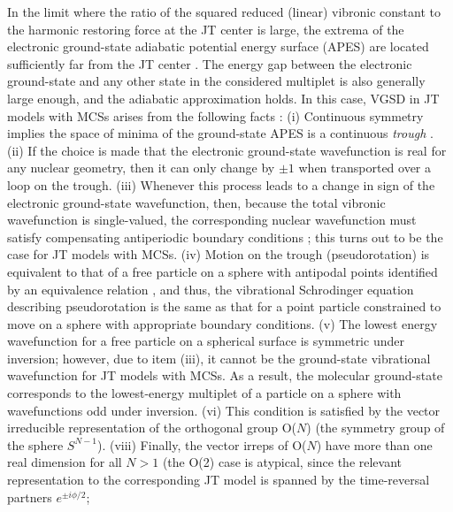 \documentclass[superscriptaddress,showpacs,amsmath,amssymb,pra,twocolumn]{revtex4-1}
\begin{document}
In the limit where the ratio of the squared reduced (linear) vibronic constant
to the harmonic restoring force at the JT center is large, the extrema
of the electronic ground-state adiabatic potential energy surface
(APES) are located sufficiently far from the JT center \cite{bersuker_jahn-teller_2006}.
The energy gap between the electronic ground-state and any other state
in the considered multiplet is also generally large enough, and the
adiabatic approximation holds. In this case, VGSD in JT models with
MCSs arises from the following facts \cite{bersuker_jahn-teller_2006,chancey1997jahn}:
(i) Continuous symmetry implies the space of minima of the ground-state
APES is a continuous \textit{trough} \cite{pooler_continuous_1978,judd_jahnteller_1984,ceulemans_a._structure_1987,ribeiro_continuous_2017}.
(ii) If the choice is made that the electronic ground-state wavefunction
is real for any nuclear geometry, then it can only change by $\pm1$
when transported over a loop on the trough. (iii) Whenever this process
leads to a change in sign of the electronic ground-state wavefunction,
then, because the total vibronic wavefunction is single-valued, the
corresponding nuclear wavefunction must satisfy compensating antiperiodic
boundary conditions \cite{longuet-higgins_studies_1958,obrien_dynamic_1969-2,cullerne_jahn-teller_1994,de_los_rios_dynamical_1996,chancey1997jahn};
this turns out to be the case for JT models with MCSs. (iv) Motion
on the trough (pseudorotation) is equivalent to that of a free particle
on a sphere with antipodal points identified by an equivalence relation
\cite{obrien_dynamic_1969-2,ceulemans_a._structure_1987,de_los_rios_dynamical_1996,chancey1997jahn,ribeiro_continuous_2017},
and thus, the vibrational Schrodinger equation describing pseudorotation
is the same as that for a point particle constrained to move on a
sphere with appropriate boundary conditions. (v) The lowest energy wavefunction for a free particle on a spherical surface is symmetric under inversion; however, due to
item (iii), it cannot be the ground-state vibrational wavefunction
for JT models with MCSs. As a result, the molecular ground-state corresponds
to the lowest-energy multiplet of a particle on a sphere with wavefunctions
odd under inversion. (vi) This condition is satisfied by the vector
irreducible representation of the orthogonal group O($N$) (the symmetry
group of the sphere $S^{N-1}$). (viii) Finally, the vector irreps
of O($N$) have more than one real dimension for all $N>1$ (the O(2)
case is atypical, since the relevant representation to the corresponding
JT model is spanned by the time-reversal partners $e^{\pm i\phi/2}$;
\end{document}
